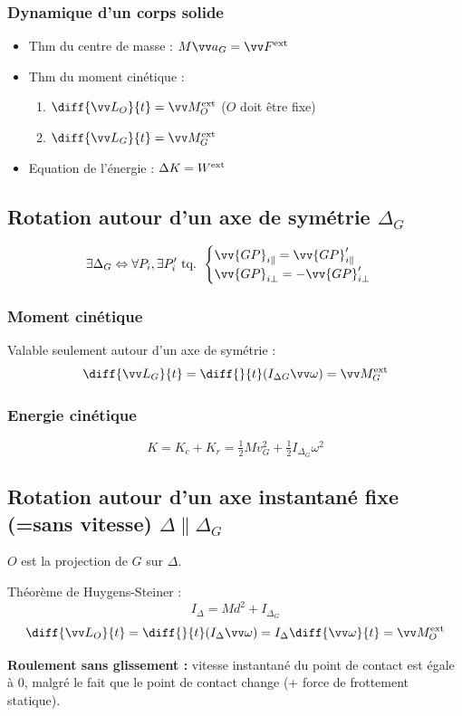\documentclass[../main.tex]{subfiles}
\begin{document}
\subsubsection{Dynamique d'un corps solide}
\begin{itemize}
  \item Thm du centre de masse : \( M\ac_G = \F^{\exte} \)
  \item Thm du moment cinétique : 
    \begin{enumerate}
      \item \(\diff{\mc_O}{t} = \mf_O^{\exte}\) (\(O\) doit être fixe)
      \item \(\diff{\mc_G}{t} = \mf_G^{\exte}\)
    \end{enumerate} 
  \item Equation de l'énergie : \(\Delta K = W^{\text{ext}}\)
\end{itemize}

\subsection{Rotation autour d'un axe de symétrie \(\Delta_G\)}
\[
  \exists \Delta_G \Leftrightarrow \forall P_i, \exists P_i' \text{ tq. } 
  \begin{cases}
    \vv{GP}_{i\parallel}=\vv{GP}_{i\parallel}'\\
    \vv{GP}_{i\bot}=-\vv{GP}_{i\bot}'\\
  \end{cases}
\]

\subsubsection{Moment cinétique}
Valable seulement autour d'un axe de symétrie : 
\[
  \diff{\mc_G}{t} = \diff{}{t}(I_{\Delta G}\vian)=\mf^{\exte}_G
\]
\subsubsection{Energie cinétique}
\[
  K = K_c + K_r = \tfrac{1}{2}Mv_G^2 + \tfrac{1}{2}I_{\Delta_G}\omega^2
\]

\subsection{Rotation autour d'un axe instantané fixe (=sans vitesse) \(\Delta \parallel \Delta_G\)}
\(O\) est la projection de \(G\) sur \(\Delta\).

Théorème de Huygens-Steiner : 
\[
  I_{\Delta} = Md^2 + I_{\Delta_G}
\]
\[
  \diff{\mc_O}{t} = \diff{}{t}(I_{\Delta}\vian) = I_{\Delta}\diff{\vian}{t}=\mf_O^{\exte}
\]

\textbf{Roulement sans glissement : } vitesse instantané du point de contact est égale à 0, malgré le fait que le point de contact change (+ force de frottement statique).
\end{document}
